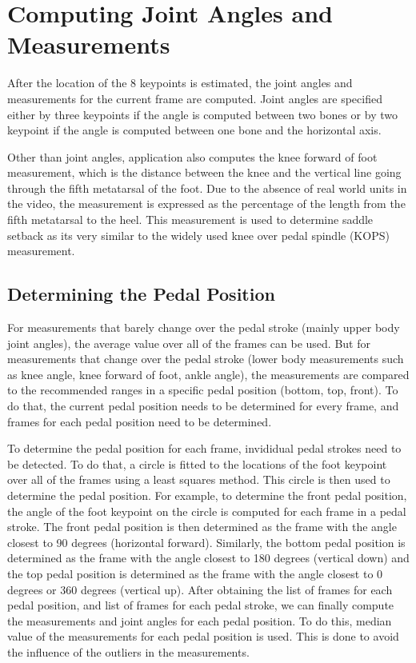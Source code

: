 \section{Computing Joint Angles and Measurements}
\label{computing_joint_angles}

After the location of the 8 keypoints is estimated, the joint angles and measurements for the current frame are computed. Joint angles are specified either by three keypoints if the angle is computed between two bones or by two keypoint if the angle is computed between one bone and the horizontal axis.

Other than joint angles, application also computes the knee forward of foot measurement, which is the distance between the knee and the vertical line going through the fifth metatarsal of the foot. Due to the absence of real world units in the video, the measurement is expressed as the percentage of the length from the fifth metatarsal to the heel. This measurement is used to determine saddle setback as its very similar to the widely used knee over pedal spindle (KOPS) measurement.

\subsection{Determining the Pedal Position}
For measurements that barely change over the pedal stroke (mainly upper body joint angles), the average value over all of the frames can be used. But for measurements that change over the pedal stroke (lower body measurements such as knee angle, knee forward of foot, ankle angle), the measurements are compared to the recommended ranges in a specific pedal position (bottom, top, front). To do that, the current pedal position needs to be determined for every frame, and frames for each pedal position need to be determined.

To determine the pedal position for each frame, invididual pedal strokes need to be detected. To do that, a circle is fitted to the locations of the foot keypoint over all of the frames using a least squares method. This circle is then used to determine the pedal position. For example, to determine the front pedal position, the angle of the foot keypoint on the circle is computed for each frame in a pedal stroke. The front pedal position is then determined as the frame with the angle closest to 90 degrees (horizontal forward). Similarly, the bottom pedal position is determined as the frame with the angle closest to 180 degrees (vertical down) and the top pedal position is determined as the frame with the angle closest to 0 degrees or 360 degrees (vertical up). After obtaining the list of frames for each pedal position, and list of frames for each pedal stroke, we can finally compute the measurements and joint angles for each pedal position. To do this, median value of the measurements for each pedal position is used. This is done to avoid the influence of the outliers in the measurements.


